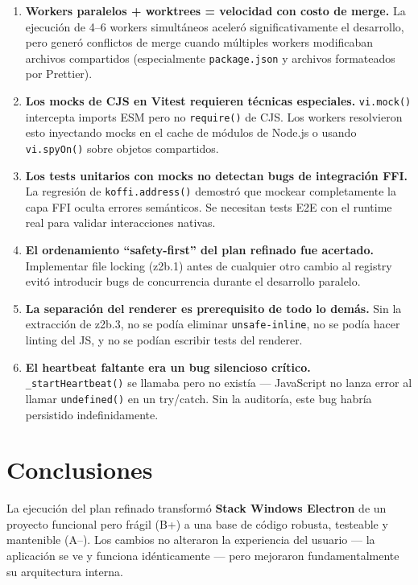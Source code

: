 \documentclass[12pt,a4paper]{article}
\begin{document}
\begin{enumerate}
    \item \textbf{Workers paralelos + worktrees = velocidad con costo de merge.} La ejecuci\'on de 4--6 workers simult\'aneos aceler\'o significativamente el desarrollo, pero gener\'o conflictos de merge cuando m\'ultiples workers modificaban archivos compartidos (especialmente \texttt{package.json} y archivos formateados por Prettier).

    \item \textbf{Los mocks de CJS en Vitest requieren t\'ecnicas especiales.} \texttt{vi.mock()} intercepta imports ESM pero no \texttt{require()} de CJS. Los workers resolvieron esto inyectando mocks en el cache de m\'odulos de Node.js o usando \texttt{vi.spyOn()} sobre objetos compartidos.

    \item \textbf{Los tests unitarios con mocks no detectan bugs de integraci\'on FFI.} La regresi\'on de \texttt{koffi.address()} demostr\'o que mockear completamente la capa FFI oculta errores sem\'anticos. Se necesitan tests E2E con el runtime real para validar interacciones nativas.

    \item \textbf{El ordenamiento ``safety-first'' del plan refinado fue acertado.} Implementar file locking (z2b.1) antes de cualquier otro cambio al registry evit\'o introducir bugs de concurrencia durante el desarrollo paralelo.

    \item \textbf{La separaci\'on del renderer es prerequisito de todo lo dem\'as.} Sin la extracci\'on de z2b.3, no se pod\'ia eliminar \texttt{unsafe-inline}, no se pod\'ia hacer linting del JS, y no se pod\'ian escribir tests del renderer.

    \item \textbf{El heartbeat faltante era un bug silencioso cr\'itico.} \texttt{\_startHeartbeat()} se llamaba pero no exist\'ia --- JavaScript no lanza error al llamar \texttt{undefined()} en un try/catch. Sin la auditor\'ia, este bug habr\'ia persistido indefinidamente.
\end{enumerate}

\section{Conclusiones}

La ejecuci\'on del plan refinado transform\'o \textbf{Stack Windows Electron} de un proyecto funcional pero fr\'agil (B+) a una base de c\'odigo robusta, testeable y mantenible (A--). Los cambios no alteraron la experiencia del usuario --- la aplicaci\'on se ve y funciona id\'enticamente --- pero mejoraron fundamentalmente su arquitectura interna.
\end{document}
